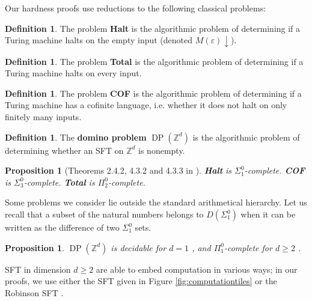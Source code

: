 \documentclass[a4paper]{article}
\newcommand{\DP}{\operatorname{DP}}
\newcommand{\Z}{\mathbb{Z}}
\newcommand{\Zd}{\mathbb{Z}^d}
\newtheorem{proposition}[theorem]{Proposition}
\theoremstyle{definition}
\newtheorem{definition}[theorem]{Definition}
\begin{document}
Our hardness proofs use reductions to the following classical problems:

\begin{definition}
    The problem \textbf{Halt} is the algorithmic problem of determining if a Turing machine halts on the empty input (denoted $M(\varepsilon)\downarrow$).
\end{definition}

\begin{definition}
    The problem \textbf{Total} is the algorithmic problem of determining if a Turing machine halts on every input.
\end{definition}

\begin{definition}\label{COFhard}
    The problem \textbf{COF} is the algorithmic problem of determining if a Turing machine has a cofinite language, i.e. whether it does not halt on only finitely many inputs.
\end{definition}

\begin{definition}The \textbf{domino problem} $\DP(\Zd)$ is the algorithmic problem of determining whether an SFT on $\Z^d$ is nonempty.
\end{definition}

\begin{proposition}[Theorems 2.4.2, 4.3.2 and 4.3.3 in \cite{soare_turing_2016}]\label{classicalpb}
    \textbf{Halt} is $\Sigma^0_1$-complete.
    \textbf{COF} is $\Sigma^0_3$-complete.
    \textbf{Total} is $\Pi^0_2$-complete.
\end{proposition}
Some problems we consider lie outside the standard arithmetical hierarchy. Let us recall that a subset of the natural numbers belongs to $D(\Sigma_1^0)$ when it can be written as the difference of two $\Sigma_1^0$ sets. 
\begin{proposition}
$\DP(\Zd)$ is decidable for $d=1$ \cite{lind_introduction_1995}, and $\Pi_1^0$-complete for $d\geq 2$ \cite{berger_undecidability_1966}. 
\end{proposition}

SFT in dimension $d\geq 2$ are able to embed computation in various ways; in our proofs, we use either the SFT given in Figure \ref{fig:computationtiles} or the Robinson SFT \cite{robinson_undecidability_1971}. 
\end{document}
